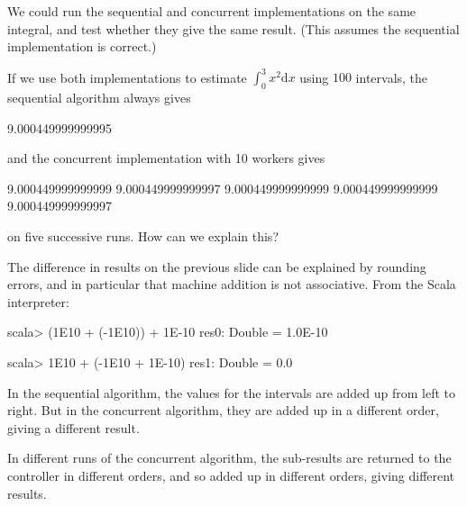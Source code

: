 



\begin{slide}

We could run the sequential and concurrent implementations on the same
integral, and test whether they give the same result.  (This assumes the
sequential implementation is correct.)   

If we use both implementations to estimate $\int_0^3 x^2 \mbox{d}x$ using
$100$ intervals, the sequential algorithm always gives
\begin{scala}
  9.000449999999995
\end{scala}
%
and the concurrent implementation with 10 workers gives
\begin{scala}
  9.000449999999999
  9.000449999999997
  9.000449999999999
  9.000449999999999
  9.000449999999997 
\end{scala}
on five successive runs.
How can we explain this?
\end{slide}


\begin{selfnote}

The difference in results on the previous slide can be explained by rounding
errors, and in particular that machine addition is not associative.  From the
Scala interpreter:
\begin{scala}
scala> (1E10 + (-1E10)) + 1E-10
res0: Double = 1.0E-10

scala> 1E10 + (-1E10 + 1E-10)
res1: Double = 0.0
\end{scala}
%
In the sequential algorithm, the values for the intervals are added up from
left to right.  But in the concurrent algorithm, they are added up in a
different order, giving a different result. 

In different runs of the concurrent algorithm, the sub-results are returned to
the controller in different orders, and so added up in different orders,
giving different results. 
\end{selfnote}


